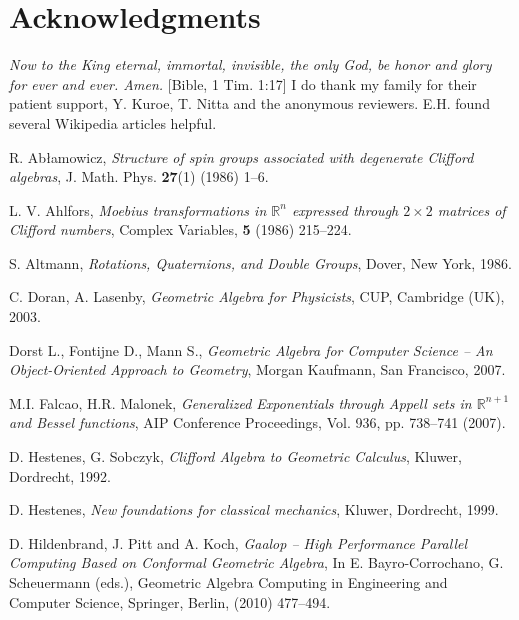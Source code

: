 \documentclass[cameraready]{jcmsi}%
\newcommand{\R}{\mathbb{R}}
\begin{document}
\section*{Acknowledgments}

\textit{Now to the King eternal, immortal, invisible, the only God, be honor and glory for ever and ever. Amen.} [Bible, 1 Tim. 1:17] I do thank my family for their patient support, Y. Kuroe, T. Nitta and the anonymous reviewers. E.H. found several Wikipedia articles helpful.


\begin{thebibliography}{99}

  R. Ab{\l}amowicz,
  \textit{Structure of spin groups associated with degenerate Clifford algebras},
  J. Math. Phys. \textbf{27}(1) (1986) 1--6. 

  L. V. Ahlfors, 
  \textit{Moebius transformations in $\R^n$ expressed through $2\times 2$ matrices of Clifford numbers}, 
  Complex Variables, \textbf{5} (1986) 215--224.
  
  S. Altmann,
  \textit{Rotations, Quaternions, and Double Groups},
  Dover, New York, 1986.
  
  C. Doran, A. Lasenby,
  \textit{Geometric Algebra for Physicists},
  CUP, Cambridge (UK), 2003.
  
  Dorst L., Fontijne D., Mann S., 
  \textit{Geometric Algebra for Computer Science 
  -- An Object-Oriented Approach to Geometry}, 
  Morgan Kaufmann, 
  San Francisco, 2007.
    
  M.I. Falcao, H.R. Malonek,
  \textit{Generalized Exponentials through Appell sets in $\R^{n+1}$ and
  Bessel functions},
  AIP Conference Proceedings, 
  Vol. 936, pp. 738--741 (2007).
  
  D. Hestenes, G. Sobczyk,
  \textit{Clifford Algebra to Geometric Calculus},
  Kluwer, Dordrecht, 1992.
  
  D. Hestenes,
  \textit{New foundations for classical mechanics},
  Kluwer, Dordrecht, 1999.
  
  D. Hildenbrand, J. Pitt and A. Koch,
  \textit{Gaalop -- High Performance Parallel Computing Based on Conformal Geometric Algebra},  
  In E. Bayro-Corrochano, G. Scheuermann (eds.), 
  Geometric Algebra Computing in Engineering and Computer Science,
  Springer, Berlin, 
  (2010) 477--494.
  

\end{thebibliography}
\end{document}
